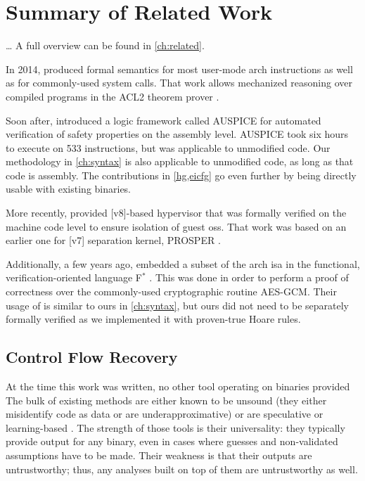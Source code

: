 \section{Summary of Related Work}
\todo\dots
A full overview can be found in \cref{ch:related}.

In 2014, \textcite{goel2014syscalls,goelphd} produced formal semantics
for most user-mode \gls{arch} instructions as well as for commonly-used system calls.
That work allows mechanized reasoning over compiled programs in the ACL2 theorem prover \autocite{ACL2}.

Soon after, \textcite{tan2015auspice} introduced a logic framework called AUSPICE for automated verification of safety properties on the assembly level.
AUSPICE took six hours to execute on \num{533} instructions, but was applicable to unmodified code.
Our methodology in \cref{ch:syntax} is also applicable to unmodified code, as long as that code is assembly.
The contributions in \cref{hg,eicfg} go even further by being directly usable with existing binaries.

More recently, \textcite{baumann2016high} provided [v8]-based hypervisor that was formally verified on the machine code level to ensure isolation of guest \acp{os}.
That work was based on an earlier one for [v7] separation kernel, PROSPER \autocite{dam2013hypervisor,dam2013formal}.

Additionally, a few years ago, \textcite{fromherz2019verified} embedded a subset of the \gls{arch} \ac{isa} in the functional, verification-oriented language F$^*$ \autocite{fstar}.
This was done in order to perform a proof of correctness over the commonly-used cryptographic routine AES-GCM.
Their usage of  is similar to ours in \cref{ch:syntax}, but ours did not need to be separately formally verified as we implemented it with proven-true Hoare rules.

\subsection{Control Flow Recovery}
At the time this work was written, no other tool operating on binaries
provided 
The bulk of existing methods are either known to be unsound (they either  misidentify code as data or are underapproximative) \autocite{schwartz2002disassembly} or are speculative or learning-based \autocite{wartell2011differentiating,khadra2016speculative}.
The strength of those tools is their universality: they typically provide output for any binary, even in cases where guesses and non-validated assumptions have to be made.
Their weakness is that their outputs are untrustworthy; thus, any analyses built on top of them are untrustworthy as well.

